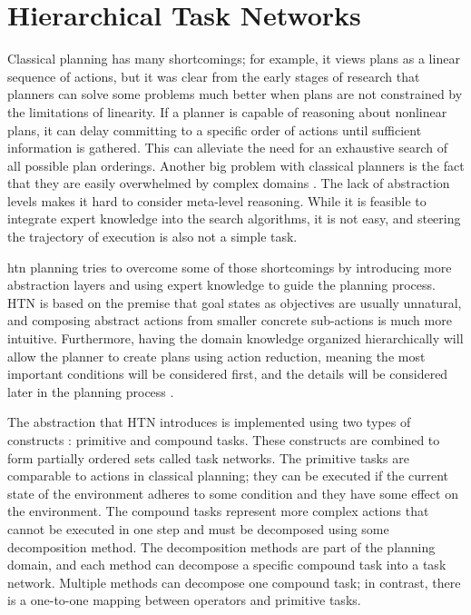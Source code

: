 \section{Hierarchical Task Networks}
\label{sec:HTNPlanning}
Classical planning has many shortcomings; for example, 
it views plans as a linear sequence of actions, but it was clear from the early stages of research \cite{NonlinearNaturePlanssacerdoti1975} that planners can solve some problems much better when plans are not constrained by the limitations of linearity. If a planner is capable of reasoning about nonlinear plans, it can delay committing to a specific order of actions until sufficient information is gathered. This can alleviate the need for an exhaustive search of all possible plan orderings. Another big problem with classical planners is the fact that they are easily overwhelmed by complex domains \cite{PracticalPlanningExtendingwilkins1989}. The lack of abstraction levels makes it hard to consider meta-level reasoning. While it is feasible to integrate expert knowledge into the search algorithms, it is not easy, and steering the trajectory of execution is also not a simple task.

\gls{htn} planning tries to overcome some of those shortcomings by introducing more abstraction layers and using expert knowledge to guide the planning process. HTN is based on the premise that goal states as objectives are usually unnatural, and composing abstract actions from smaller concrete sub-actions is much more intuitive. Furthermore, having the domain knowledge organized hierarchically will allow the planner to create plans using action reduction, meaning the most important conditions will be considered first, and the details will be considered later in the planning process \cite{FormalizingPlanningKnowledgeyang1990}.

The abstraction that HTN introduces is implemented using two types of constructs \cite{PANDAFrameworkHierarchicalholler2021}: primitive and compound tasks. These constructs are combined to form partially ordered sets called task networks. The primitive tasks are comparable to actions in classical planning; they can be executed if the current state of the environment adheres to some condition and they have some effect on the environment. The compound tasks represent more complex actions that cannot be executed in one step and must be decomposed using some decomposition method. The decomposition methods are part of the planning domain, and each method can decompose a specific compound task into a task network. Multiple methods can decompose one compound task; in contrast, there is a one-to-one mapping between operators and primitive tasks.


